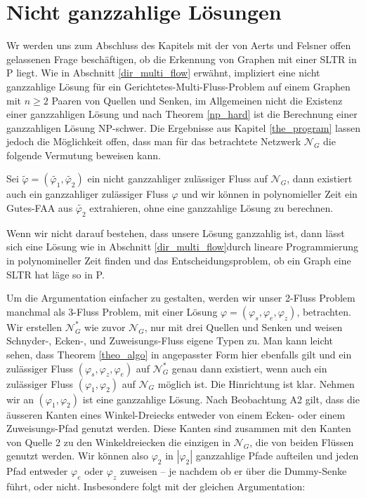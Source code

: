 \section{Nicht ganzzahlige Lösungen}

Wr werden uns zum Abschluss des Kapitels mit der von Aerts und Felsner offen gelassenen Frage beschäftigen, ob die Erkennung von Graphen mit einer SLTR in P liegt. Wie in Abschnitt \ref{dir_multi_flow} erwähnt, impliziert eine nicht ganzzahlige Lösung für ein Gerichtetes-Multi-Fluss-Problem auf einem Graphen mit $n\geq 2$ Paaren von Quellen und Senken, im Allgemeinen nicht die Existenz einer ganzzahligen Lösung und nach Theorem \ref{np_hard} ist die Berechnung einer ganzzahligen Lösung NP-schwer. Die Ergebnisse aus Kapitel \ref{the_program} lassen jedoch die Möglichkeit offen, dass man für das betrachtete Netzwerk $\mathcal{N}_G$ die folgende Vermutung beweisen kann.

\begin{conjecture}\label{int_conj}
Sei $\tilde{\varphi}=(\tilde{\varphi_1},\tilde{\varphi_2})$ ein nicht ganzzahliger zulässiger Fluss auf $\mathcal{N}_G$, dann existiert auch ein ganzzahliger zulässiger Fluss $\varphi$ und wir können in polynomieller Zeit ein Gutes-FAA aus $\tilde{\varphi_2}$ extrahieren, ohne eine ganzzahlige Lösung zu berechnen.
\end{conjecture}

\begin{remark}
Wenn wir nicht darauf bestehen, dass unsere Lösung ganzzahlig ist, dann lässt sich eine Lösung wie in Abschnitt \ref{dir_multi_flow}durch lineare Programmierung in polynomineller Zeit finden und das Entscheidungsproblem, ob ein Graph eine SLTR hat läge so in P.
\end{remark}

Um die Argumentation einfacher zu gestalten, werden wir unser 2-Fluss Problem manchmal als 3-Fluss Problem, mit einer Lösung $\varphi=(\varphi_s,\varphi_e,\varphi_z)$, betrachten. Wir erstellen $\mathcal{N}^*_G$ wie zuvor $\mathcal{N}_G$, nur mit drei Quellen und Senken und weisen {Schnyder-,} Ecken-, und Zuweisungs-Fluss eigene Typen zu. Man kann leicht sehen, dass Theorem \ref{theo_algo} in angepasster Form hier ebenfalls gilt und ein zulässiger  Fluss $(\varphi_s,\varphi_z,\varphi_e)$ auf $\mathcal{N}_G^*$ genau dann existiert, wenn auch ein zulässiger Fluss $(\varphi_1,\varphi_2)$ auf $\mathcal{N}_G$ möglich ist. Die Hinrichtung ist klar. Nehmen wir an $(\varphi_1,\varphi_2)$ ist eine ganzzahlige Lösung. Nach Beobachtung A2 gilt, dass die äusseren Kanten eines Winkel-Dreiecks entweder von einem Ecken- oder einem Zuweisungs-Pfad genutzt werden. Diese Kanten sind zusammen mit den Kanten von Quelle 2 zu den Winkeldreiecken die einzigen in $\mathcal{N}_G$, die von beiden Flüssen genutzt werden. Wir können also $\varphi_2$ in $|\varphi_2|$ ganzzahlige Pfade aufteilen und jeden Pfad entweder $\varphi_e$ oder $\varphi_z$ zuweisen -- je nachdem ob er über die Dummy-Senke führt, oder nicht. Insbesondere folgt mit der gleichen Argumentation:

